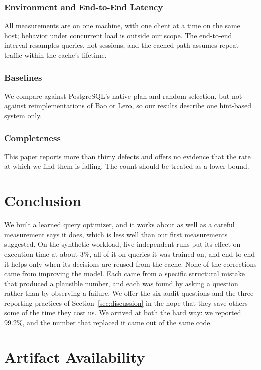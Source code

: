 \documentclass[conference]{IEEEtran}
\begin{document}
\subsubsection{Environment and End-to-End Latency}
All measurements are on one machine, with one client at a time on the same
host; behavior under concurrent load is outside our scope. The end-to-end
interval resamples queries, not sessions, and the cached path assumes repeat
traffic within the cache's lifetime.

\subsubsection{Baselines}
We compare against PostgreSQL's native plan and random selection, but not
against reimplementations of Bao or Lero, so our results describe one
hint-based system only.

\subsubsection{Completeness}
This paper reports more than thirty defects and offers no
evidence that the rate at which we find them is falling. The count should be
treated as a lower bound.

\section{Conclusion}
\label{sec:conclusion}

We built a learned query optimizer, and it works about as well as a careful
measurement says it does, which is less well than our first measurements
suggested. On the synthetic workload, five independent runs put its effect on
execution time at about 3\%, all of it on queries it was trained on, and end to
end it helps only when its decisions are reused from the cache. None of the
corrections came from improving the model. Each came
from a specific structural mistake that produced a plausible number, and each
was found by asking a question rather than by observing a failure. We offer the six audit questions
and the three reporting practices of Section~\ref{sec:discussion} in the hope that
they save others some of the time they cost us. We arrived at both the hard way:
we reported 99.2\%, and the number that replaced it came out of the same code.

\section*{Artifact Availability}
\end{document}
